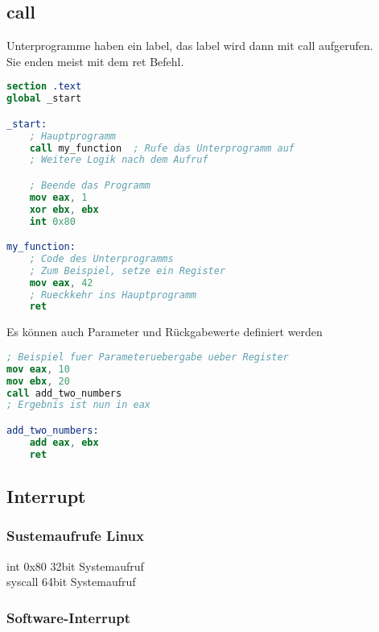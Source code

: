 \documentclass[a4paper,12pt,twoside]{article}
\begin{document}
\subsection{call}
Unterprogramme haben ein label, das label wird dann mit call aufgerufen. \\ 
Sie enden meist mit dem ret Befehl. 
\begin{center}
  \begin{minipage}{1.0\textwidth}
    \begin{lstlisting}[language=NASM]
section .text
global _start

_start:
    ; Hauptprogramm
    call my_function  ; Rufe das Unterprogramm auf
    ; Weitere Logik nach dem Aufruf

    ; Beende das Programm
    mov eax, 1
    xor ebx, ebx
    int 0x80

my_function:
    ; Code des Unterprogramms
    ; Zum Beispiel, setze ein Register
    mov eax, 42
    ; Rueckkehr ins Hauptprogramm
    ret
    \end{lstlisting}
  \end{minipage}
\end{center}
Es können auch Parameter und Rückgabewerte definiert werden 
\begin{center}
  \begin{minipage}{1.0\textwidth}
    \begin{lstlisting}[language=NASM]
; Beispiel fuer Parameteruebergabe ueber Register
mov eax, 10
mov ebx, 20
call add_two_numbers
; Ergebnis ist nun in eax

add_two_numbers:
    add eax, ebx
    ret
    \end{lstlisting}
  \end{minipage}
\end{center}
\subsection{Interrupt}
\subsubsection{Sustemaufrufe Linux}
\hspace{2mm} int 0x80 \hspace{50mm} 32bit Systemaufruf \\ 
\> syscall \> 64bit Systemaufruf \\
\subsubsection{Software-Interrupt}
\begin{center}
  \begin{minipage}{1.0\textwidth}
    \begin{lstlisting}[language=NASM]

      
    \end{lstlisting}
    
  \end{minipage}
  
\end{center}
\end{document}

